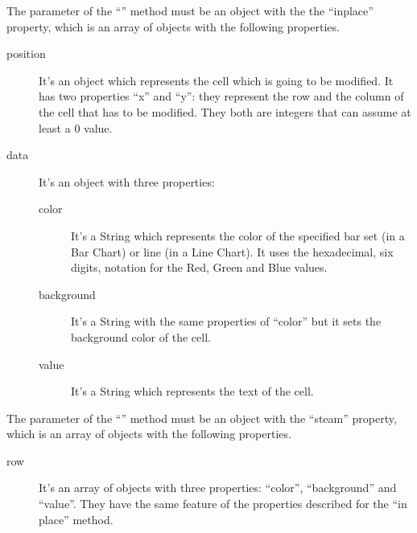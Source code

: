 				The parameter of the “” method must be an object with the the “inplace” property, which is an array of objects with the following properties. 
				\begin{description}
					\item[position] It's an object which represents the cell which is going to be modified. It has two properties “x” and “y”: they represent the row and the column of the cell that has to be modified. They both are integers that can assume at least a 0 value.
					\item[data] It's an object with three properties:
					\begin{description}
						\item[color] It's a String which represents the color of the specified bar set (in a Bar Chart) or line (in a Line Chart). It uses the hexadecimal, six digits, notation for the Red, Green and Blue values. 
						\item[background] It's a String with the same properties of “color” but it sets the background color of the cell.
						\item[value] It's a String which represents the text of the cell.
					\end{description}
				\end{description}
				The parameter of the “” method must be an object with the “steam” property, which is an array of objects with the following properties.
				\begin{description}
					\item[row] It's an array of objects with three properties: “color”, “background” and “value”. They have the same feature of the properties described for the “in place” method.
				\end{description}